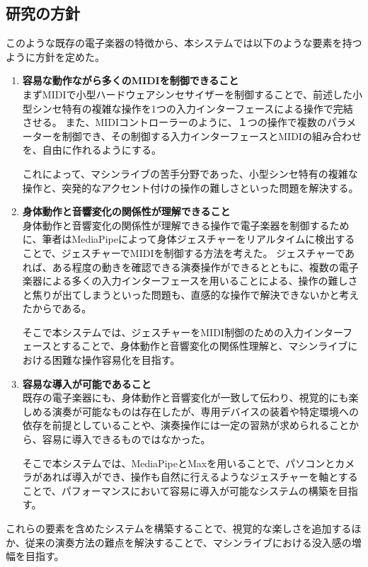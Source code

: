 \subsection{研究の方針}
このような既存の電子楽器の特徴から、本システムでは以下のような要素を持つように方針を定めた。
\begin{enumerate}
	\item \textbf{容易な動作ながら多くのMIDIを制御できること}　\\
	      まずMIDIで小型ハードウェアシンセサイザーを制御することで、前述した小型シンセ特有の複雑な操作を1つの入力インターフェースによる操作で完結させる。
	      また、MIDIコントローラーのように、１つの操作で複数のパラメーターを制御でき、その制御する入力インターフェースとMIDIの組み合わせを、自由に作れるようにする。

	      これによって、マシンライブの苦手分野であった、小型シンセ特有の複雑な操作と、突発的なアクセント付けの操作の難しさといった問題を解決する。
	\item \textbf{身体動作と音響変化の関係性が理解できること}　\\
	      身体動作と音響変化の関係性が理解できる操作で電子楽器を制御するために、筆者はMediaPipeによって身体ジェスチャーをリアルタイムに検出することで、ジェスチャーでMIDIを制御する方法を考えた。
	      ジェスチャーであれば、ある程度の動きを確認できる演奏操作ができるとともに、複数の電子楽器による多くの入力インターフェースを用いることによる、操作の難しさと焦りが出てしまうといった問題も、直感的な操作で解決できないかと考えたからである。

	      そこで本システムでは、ジェスチャーをMIDI制御のための入力インターフェースとすることで、身体動作と音響変化の関係性理解と、マシンライブにおける困難な操作容易化を目指す。
	\item \textbf{容易な導入が可能であること}　\\
	      既存の電子楽器にも、身体動作と音響変化が一致して伝わり、視覚的にも楽しめる演奏が可能なものは存在したが、専用デバイスの装着や特定環境への依存を前提としていることや、演奏操作には一定の習熟が求められることから、容易に導入できるものではなかった。

	      そこで本システムでは、MediaPipeとMaxを用いることで、パソコンとカメラがあれば導入ができ、操作も自然に行えるようなジェスチャーを軸とすることで、パフォーマンスにおいて容易に導入が可能なシステムの構築を目指す。
\end{enumerate}

これらの要素を含めたシステムを構築することで、視覚的な楽しさを追加するほか、従来の演奏方法の難点を解決することで、マシンライブにおける没入感の増幅を目指す。

